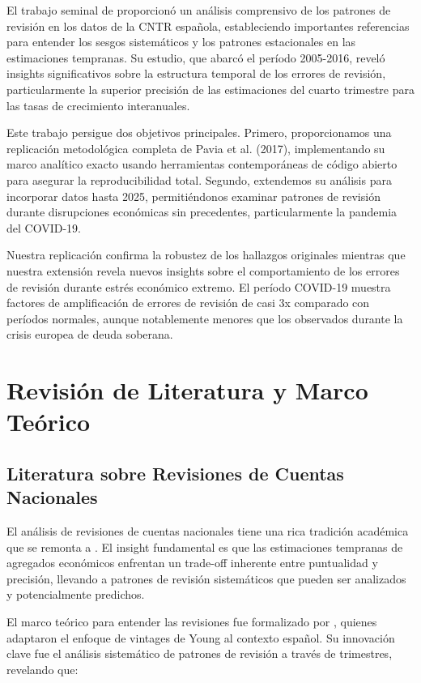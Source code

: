 \documentclass[12pt,a4paper]{article}
\begin{document}
El trabajo seminal de \citet{pavia2017} proporcionó un análisis comprensivo de los patrones de revisión en los datos de la CNTR española, estableciendo importantes referencias para entender los sesgos sistemáticos y los patrones estacionales en las estimaciones tempranas. Su estudio, que abarcó el período 2005-2016, reveló insights significativos sobre la estructura temporal de los errores de revisión, particularmente la superior precisión de las estimaciones del cuarto trimestre para las tasas de crecimiento interanuales.

Este trabajo persigue dos objetivos principales. Primero, proporcionamos una replicación metodológica completa de Pavia et al. (2017), implementando su marco analítico exacto usando herramientas contemporáneas de código abierto para asegurar la reproducibilidad total. Segundo, extendemos su análisis para incorporar datos hasta 2025, permitiéndonos examinar patrones de revisión durante disrupciones económicas sin precedentes, particularmente la pandemia del COVID-19.

Nuestra replicación confirma la robustez de los hallazgos originales mientras que nuestra extensión revela nuevos insights sobre el comportamiento de los errores de revisión durante estrés económico extremo. El período COVID-19 muestra factores de amplificación de errores de revisión de casi 3x comparado con períodos normales, aunque notablemente menores que los observados durante la crisis europea de deuda soberana.

\section{Revisión de Literatura y Marco Teórico}

\subsection{Literatura sobre Revisiones de Cuentas Nacionales}

El análisis de revisiones de cuentas nacionales tiene una rica tradición académica que se remonta a \citet{young1993}. El insight fundamental es que las estimaciones tempranas de agregados económicos enfrentan un trade-off inherente entre puntualidad y precisión, llevando a patrones de revisión sistemáticos que pueden ser analizados y potencialmente predichos.

El marco teórico para entender las revisiones fue formalizado por \citet{pavia2017}, quienes adaptaron el enfoque de vintages de Young al contexto español. Su innovación clave fue el análisis sistemático de patrones de revisión a través de trimestres, revelando que:
\end{document}
